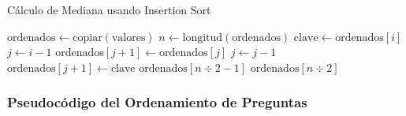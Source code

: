 \documentclass[11pt,a4paper]{article}
\begin{document}
\begin{algorithm}[H]
\caption{Cálculo de Mediana usando Insertion Sort}
\begin{algorithmic}[1]
    \State $\text{ordenados} \leftarrow \text{copiar}(\text{valores})$ 
    \State $n \leftarrow \text{longitud}(\text{ordenados})$
     
        \State $\text{clave} \leftarrow \text{ordenados}[i]$
        \State $j \leftarrow i - 1$
            \State $\text{ordenados}[j + 1] \leftarrow \text{ordenados}[j]$ 
            \State $j \leftarrow j - 1$
        \EndWhile
        \State $\text{ordenados}[j + 1] \leftarrow \text{clave}$ 
    \EndFor
     
        \State \Return $\text{ordenados}[n \div 2 - 1]$ 
    \Else {}
        \State \Return $\text{ordenados}[n \div 2]$ 
    \EndIf
\EndProcedure
\end{algorithmic}
\end{algorithm}

\subsubsection{Pseudocódigo del Ordenamiento de Preguntas}
\end{document}
